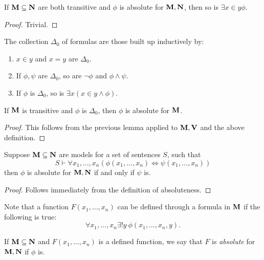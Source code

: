 \begin{lemma}
    If $\mathbf{M}\subseteq\mathbf N$ are both transitive and $\phi$ is absolute for $\mathbf{M},\mathbf N$, then so is $\exists x\in y\phi$.
\end{lemma}
\begin{proof}
    Trivial.
\end{proof}

\begin{definition}
    The collection $\Delta_0$ of formulas are those built up inductively by: 
    \begin{enumerate}[label=(\alph*)]
        \item $x\in y$ and $x = y$ are $\Delta_0$.
        \item If $\phi,\psi$ are $\Delta_0$, so are $\neg\phi$ and $\phi\wedge\psi$. 
        \item If $\phi$ is $\Delta_0$, so is $\exists x(x\in y \wedge\phi)$.
    \end{enumerate}
\end{definition}

\begin{corollary}
    If $\mathbf{M}$ is transitive and $\phi$ is $\Delta_0$, then $\phi$ is absolute for $\mathbf{M}$.
\end{corollary}
\begin{proof}
    This follows from the previous lemma applied to $\mathbf{M}, \mathbf{V}$ and the above definition.
\end{proof}

\begin{lemma}
    Suppose $\mathbf{M}\subseteq\mathbf N$ are models for a set of sentences $S$, such that 
    \begin{equation*}
        S\vdash\forall x_1,\dots,x_n\left(\phi(x_1,\dots,x_n)\iff\psi(x_1,\dots,x_n)\right)
    \end{equation*}
    then $\phi$ is absolute for $\mathbf{M},\mathbf N$ if and only if $\psi$ is.
\end{lemma}
\begin{proof}
    Follows immediately from the definition of absoluteness.
\end{proof}

Note that a function $F(x_1,\dots,x_n)$ can be defined through a formula in $\mathbf{M}$ if the following is true: 
\begin{equation*}
    \forall x_1,\dots,x_n\exists! y~\phi(x_1,\dots,x_n,y).
\end{equation*}

\begin{definition}
    If $\mathbf{M}\subseteq\mathbf N$ and $F(x_1,\dots,x_n)$ is a defined function, we say that $F$ is \emph{absolute} for $\mathbf{M},\mathbf N$ if $\phi$ is.
\end{definition}

